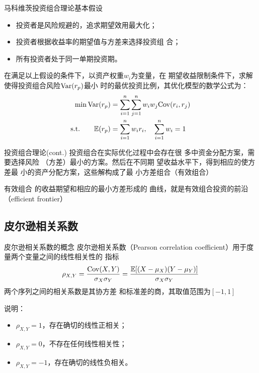 \documentclass[t]{beamer}
\newcommand{\E}{\mathbb{E}}
\begin{document}
\begin{frame}[fragile]{马科维茨投资组合理论基本假设}
\begin{itemize}
    \item 投资者是风险规避的，追求期望效用最大化；
    \item 投资者根据收益率的期望值与方差来选择投资组
    合；
    \item 所有投资者处于同一单期投资期。
\end{itemize}

在满足以上假设的条件下，以资产权重$w_i$为变量，在
期望收益限制条件下，求解使得投资组合风险${\rm Var}(r_p)$最小
时的最优投资比例，其优化模型的数学公式为：
\[\begin{split}
    \min{\rm Var}(r_p)&=\sum^n_{i=1}\sum^n_{j=1} w_iw_j {\rm Cov}(r_i,r_j)\\
    {\rm s.t.}\qquad \E(r_p)&=\sum^n_{i=1} w_ir_i,\quad \sum^n_{i=1} w_i=1
\end{split} \]

\end{frame}



\begin{frame}[fragile]{投资组合理论(cont.)}
    投资组合在实际优化过程中会存在很
    多中资金分配方案，需要选择风险
    （方差）最小的方案。然后在不同期
    望收益水平下，得到相应的使方差最
    小的资产分配方案，这些解构成了最
    小方差组合（有效组合）
    
    有效组合
    的收益期望和相应的最小方差形成的
    曲线，就是有效组合投资的前沿
    （efficient frontier）
\end{frame}


\subsection{皮尔逊相关系数}
\begin{frame}[fragile]{皮尔逊相关系数的概念}
皮尔逊相关系数（Pearson
    correlation coefficient）用于度
    量两个变量之间的{\color{red}线性相关性}的
    指标
\[\rho_{X,Y}=\frac{{\rm Cov}(X,Y)}{\sigma_X\sigma_Y}=\frac{\E[(X-\mu_X)(Y-\mu_Y)]}{\sigma_X\sigma_Y} \]
    两个序列之间的相关系数是其协方差
    和标准差的商，其取值范围为$[−1,1]$

\begin{block}{说明：}
\begin{itemize}
    \item $\rho_{X,Y}=1$，存在确切的线性正相关；
    \item $\rho_{X,Y}=0$，不存在任何线性相关性；
    \item  $\rho_{X,Y}=-1$，存在确切的线性负相关。
\end{itemize}
\end{block}
\end{frame}
\end{document}
